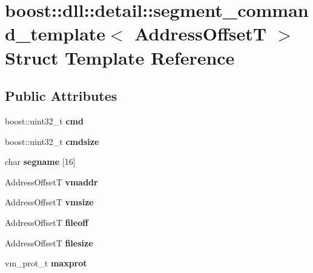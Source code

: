 \hypertarget{a00265}{}\section{boost\+:\+:dll\+:\+:detail\+:\+:segment\+\_\+command\+\_\+template$<$ Address\+OffsetT $>$ Struct Template Reference}
\label{a00265}
\subsection*{Public Attributes}
\begin{DoxyCompactItemize}
\item 
boost\+::uint32\+\_\+t {\bfseries cmd}\hypertarget{a00265_ac84bb0367bcfc8616c89e6ffba706f2b}{}\label{a00265_ac84bb0367bcfc8616c89e6ffba706f2b}

\item 
boost\+::uint32\+\_\+t {\bfseries cmdsize}\hypertarget{a00265_ae2c0634447fcb160abe26743608ba332}{}\label{a00265_ae2c0634447fcb160abe26743608ba332}

\item 
char {\bfseries segname} \mbox{[}16\mbox{]}\hypertarget{a00265_aaa669f831569da1e8d99fbe060e79b77}{}\label{a00265_aaa669f831569da1e8d99fbe060e79b77}

\item 
Address\+OffsetT {\bfseries vmaddr}\hypertarget{a00265_a40c4df13a77be36ca665e597146544bb}{}\label{a00265_a40c4df13a77be36ca665e597146544bb}

\item 
Address\+OffsetT {\bfseries vmsize}\hypertarget{a00265_ae8c1db7cb37705dbe467577602126761}{}\label{a00265_ae8c1db7cb37705dbe467577602126761}

\item 
Address\+OffsetT {\bfseries fileoff}\hypertarget{a00265_a58bd62a23d342c055ac98c1cce7aa4b3}{}\label{a00265_a58bd62a23d342c055ac98c1cce7aa4b3}

\item 
Address\+OffsetT {\bfseries filesize}\hypertarget{a00265_a317b4fe594245cc77a8d5d01d272625b}{}\label{a00265_a317b4fe594245cc77a8d5d01d272625b}

\item 
vm\+\_\+prot\+\_\+t {\bfseries maxprot}\hypertarget{a00265_a8e602b5e6938ef869de46a5c1ea25fe6}{}\label{a00265_a8e602b5e6938ef869de46a5c1ea25fe6}


\end{DoxyCompactItemize}
